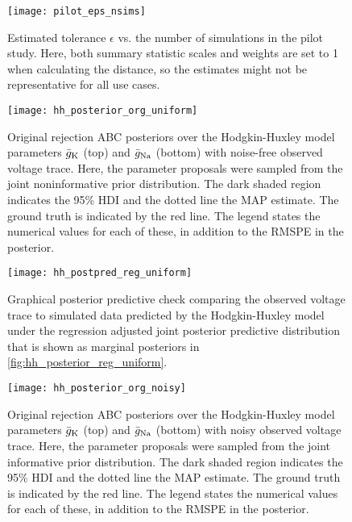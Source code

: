 
\begin{figure}[H]
    \centering
    \texttt{[image: pilot\_eps\_nsims]}
    \caption{Estimated tolerance $\epsilon$ vs. the number of simulations in the pilot study. Here, both summary statistic scales and weights are set to 1 when calculating the distance, so the estimates might not be representative for all use cases.}
\end{figure} 



\begin{figure}[H]
    \centering
    \texttt{[image: hh\_posterior\_org\_uniform]}
    \caption{Original rejection ABC posteriors over the Hodgkin-Huxley model parameters $\bar{g}_{\mathrm{K}}$ (top) and $\bar{g}_{\mathrm{Na}}$ (bottom) with noise-free observed voltage trace. Here, the parameter proposals were sampled from the joint noninformative prior distribution. The dark shaded region indicates the 95\% HDI and the dotted line the MAP estimate. The ground truth is indicated by the red line. The legend states the numerical values for each of these, in addition to the RMSPE in the posterior.}
\end{figure}


\begin{figure}[H]
    \centering
    \texttt{[image: hh\_postpred\_reg\_uniform]}
    \caption{Graphical posterior predictive check comparing the observed voltage trace to simulated data predicted by the Hodgkin-Huxley model under the regression adjusted joint posterior predictive distribution that is shown as marginal posteriors in \autoref{fig:hh_posterior_reg_uniform}.}
\end{figure}


\begin{figure}[H]
    \centering
    \texttt{[image: hh\_posterior\_org\_noisy]}
    \caption{Original rejection ABC posteriors over the Hodgkin-Huxley model parameters $\bar{g}_{\mathrm{K}}$ (top) and $\bar{g}_{\mathrm{Na}}$ (bottom) with noisy observed voltage trace. Here, the parameter proposals were sampled from the joint informative prior distribution. The dark shaded region indicates the 95\% HDI and the dotted line the MAP estimate. The ground truth is indicated by the red line. The legend states the numerical values for each of these, in addition to the RMSPE in the posterior.}
    \label{fig:hh_posterior_org_noisy}
\end{figure} 


